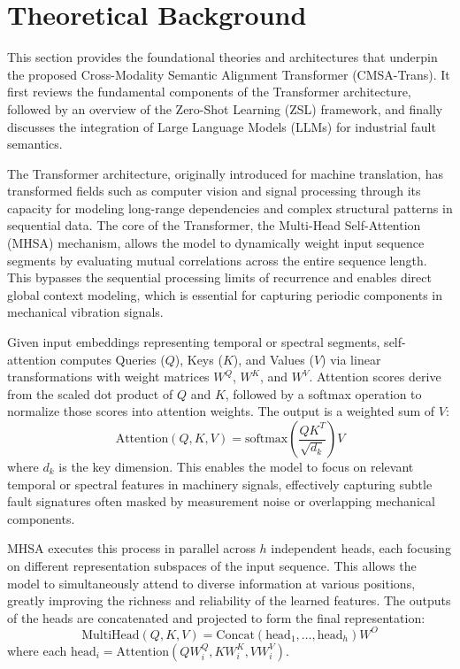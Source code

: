 \section{Theoretical Background}
This section provides the foundational theories and architectures that underpin the proposed Cross-Modality Semantic Alignment Transformer (CMSA-Trans). It first reviews the fundamental components of the Transformer architecture, followed by an overview of the Zero-Shot Learning (ZSL) framework, and finally discusses the integration of Large Language Models (LLMs) for industrial fault semantics.

The Transformer architecture, originally introduced for machine translation, has transformed fields such as computer vision and signal processing through its capacity for modeling long-range dependencies and complex structural patterns in sequential data. The core of the Transformer, the Multi-Head Self-Attention (MHSA) mechanism, allows the model to dynamically weight input sequence segments by evaluating mutual correlations across the entire sequence length. This bypasses the sequential processing limits of recurrence and enables direct global context modeling, which is essential for capturing periodic components in mechanical vibration signals.

Given input embeddings representing temporal or spectral segments, self-attention computes Queries ($Q$), Keys ($K$), and Values ($V$) via linear transformations with weight matrices $W^Q$, $W^K$, and $W^V$. Attention scores derive from the scaled dot product of $Q$ and $K$, followed by a softmax operation to normalize those scores into attention weights. The output is a weighted sum of $V$:
\begin{equation}
\text{Attention}(Q, K, V) = \text{softmax}\left(\frac{QK^T}{\sqrt{d_k}}\right)V
\end{equation}
where $d_k$ is the key dimension. This enables the model to focus on relevant temporal or spectral features in machinery signals, effectively capturing subtle fault signatures often masked by measurement noise or overlapping mechanical components.

MHSA executes this process in parallel across $h$ independent heads, each focusing on different representation subspaces of the input sequence. This allows the model to simultaneously attend to diverse information at various positions, greatly improving the richness and reliability of the learned features. The outputs of the heads are concatenated and projected to form the final representation:
\begin{equation}
\text{MultiHead}(Q, K, V) = \text{Concat}(\text{head}_1, \dots, \text{head}_h)W^O
\end{equation}
where each $\text{head}_i = \text{Attention}(QW_i^Q, KW_i^K, VW_i^V)$.

